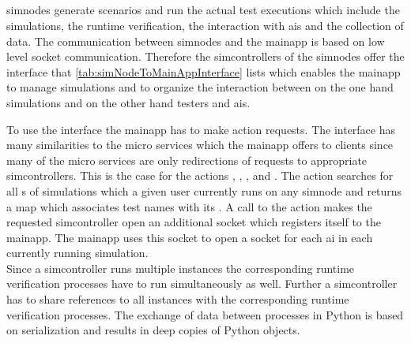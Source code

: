 \subsection{\texorpdfstring{}{SimNode}}\label{subsec:simnode}
\Glspl{simnode} generate \beamng{} scenarios and run the actual test executions which include the simulations, the runtime verification, the interaction with \glspl{ai} and the collection of data.
The communication between \glspl{simnode} and the \gls{mainapp} is based on low level socket communication.
Therefore the \glspl{simcontroller} of the \glspl{simnode} offer the interface that \cref{tab:simNodeToMainAppInterface} lists which enables the \gls{mainapp} to manage simulations and to organize the interaction between on the one hand simulations and on the other hand testers and \glspl{ai}.
\begin{table}
    \centering
    \caption{%
        Interface to \gls{mainapp} --- Describes the interface to which the \gls{mainapp} sends action requests to access the functions of the \gls{simcontroller} of a \gls{simnode}.
         describes the structure of action requests.
    }\label{tab:simNodeToMainAppInterface}
    \medskip
    
\end{table}
To use the interface the \gls{mainapp} has to make action requests.
The interface has many similarities to the micro services which the \gls{mainapp} offers to clients since many of the micro services are only redirections of requests to appropriate \glspl{simcontroller}.
This is the case for the actions , , ,  and .
The action  searches for all \unskip{}s of simulations which a given user currently runs on any \gls{simnode} and returns a map which associates test names with its .
A call to the action  makes the requested \gls{simcontroller} open an additional socket which registers itself to the \gls{mainapp}.
The \gls{mainapp} uses this socket to open a socket for each \gls{ai} in each currently running simulation.\\
Since a \gls{simcontroller} runs multiple \beamng{} instances the corresponding runtime verification processes have to run simultaneously as well.
Further a \gls{simcontroller} has to share references to all \beamng{} instances with the corresponding runtime verification processes.
The exchange of data between processes in Python is based on serialization and results in deep copies of Python objects.
